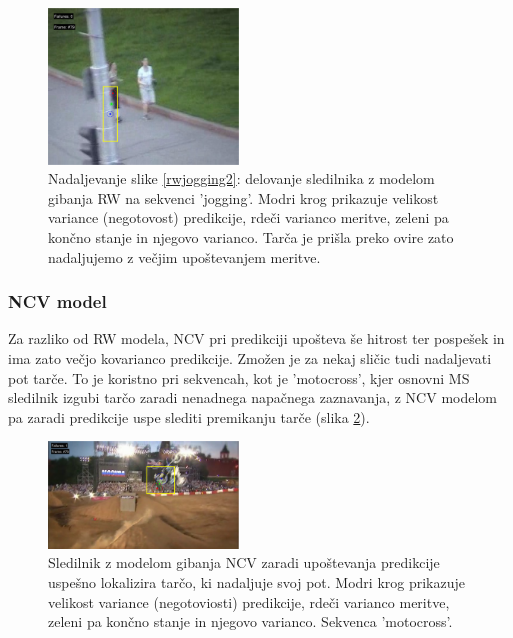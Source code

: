 \documentclass[a4paper]{article}
\begin{document}
\begin{figure}[h!]
	\begin{center}
		\includegraphics [width=0.45\textwidth] {rwjogging3.pdf}
	\end{center}
	\caption{Nadaljevanje slike \ref{rwjogging2}: delovanje sledilnika z modelom gibanja RW na sekvenci 'jogging'. Modri krog prikazuje velikost variance (negotovost) predikcije, rdeči varianco meritve, zeleni pa končno stanje in njegovo varianco. Tarča je prišla preko ovire zato nadaljujemo z večjim upoštevanjem meritve.}
	\label{rwjogging3}
\end{figure}

\subsubsection{NCV model}
Za razliko od RW modela, NCV pri predikciji upošteva še hitrost ter pospešek in ima zato večjo kovarianco predikcije. Zmožen je za nekaj sličic tudi nadaljevati pot tarče. To je koristno pri sekvencah, kot je 'motocross', kjer osnovni MS sledilnik izgubi tarčo zaradi nenadnega napačnega zaznavanja, z NCV modelom pa zaradi predikcije uspe slediti premikanju tarče (slika \ref{ncvmoto}). 
\begin{figure}[h]
	\begin{center}
		\includegraphics [width=0.45\textwidth] {ncvmoto.pdf}
	\end{center}
	\caption{Sledilnik z modelom gibanja NCV zaradi upoštevanja predikcije uspešno lokalizira tarčo, ki nadaljuje svoj pot. Modri krog prikazuje velikost variance (negotoviosti) predikcije, rdeči varianco meritve, zeleni pa končno stanje in njegovo varianco. Sekvenca 'motocross'.}
	\label{ncvmoto}
\end{figure}
\end{document}
